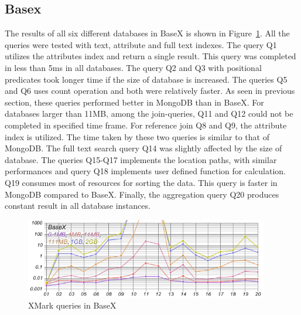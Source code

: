 \subsection{Basex}
The results of all six different databases in BaseX is shown in Figure~\ref{fig:xmark-result-basex-all}. All the queries were tested with text, attribute and full text indexes. The query Q1 utilizes the attributes index and return a single result. This query was completed in less than 5ms in all databases. The query Q2 and Q3  with positional predicates took longer time if the size of database is increased. The queries Q5 and Q6 uses count operation and both were relatively faster. As seen in previous section, these queries performed better in MongoDB than in BaseX. For databases larger than 11MB, among the join-queries,  Q11 and Q12 could not be completed in specified time frame. For reference join Q8 and Q9, the attribute index is utilized. The time taken by these two queries is  similar to that of MongoDB.  The full text search query Q14 was slightly affected by the size of database. The queries Q15-Q17 implements the location paths, with similar performances and query Q18  implements user defined function for calculation. Q19 consumes most of resources for sorting the data. This query is faster in MongoDB compared to BaseX. Finally, the aggregation query Q20 produces constant result in all database instances. 
\begin{figure}
	\centering
	\includegraphics[width=0.95\textwidth]{img/result/basex/basex-all}
	\caption{XMark queries in BaseX}
	\label{fig:xmark-result-basex-all}
\end{figure}


